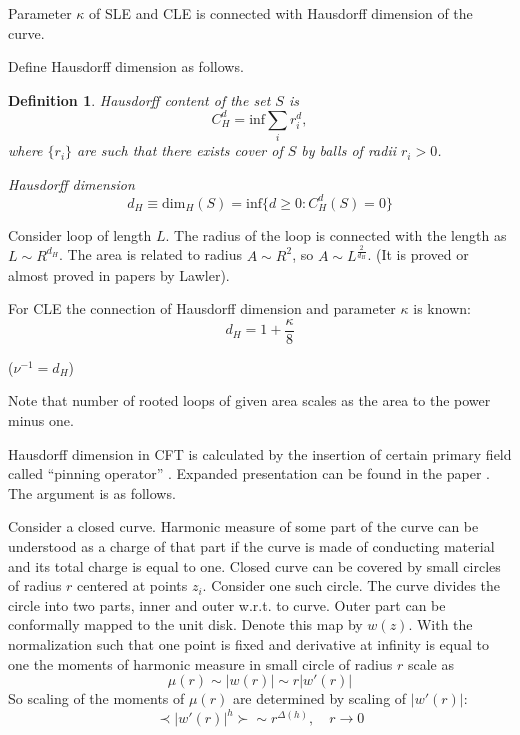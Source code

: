 \documentclass[12pt]{article}
\newtheorem{definition}{Definition}
\begin{document}
Parameter $\kappa$ of SLE and CLE is connected with Hausdorff dimension of the curve. 


Define Hausdorff dimension as follows.
\begin{definition}
  {\it Hausdorff content} of the set $S$ is
  \begin{equation}
    \label{eq:3}
    C^d_H = \mathrm{inf} \sum_i r_i^d,
  \end{equation}
  where $\{r_i\}$ are such that there exists cover of $S$ by balls of
  radii $r_i>0$. 

  {\it Hausdorff dimension}
  \begin{equation}
    \label{eq:4}
    d_H\equiv\mathrm{dim}_H(S) = \mathrm{inf}\{ d\geq 0: C^d_H(S)=0\}
  \end{equation}
\end{definition}


Consider loop of length $L$. The radius of the loop is connected with
the length as $L\sim R^{d_H}$. The area is related to radius $A\sim
R^2$, so $A\sim L^{\frac{2}{d_H}}$.
(It is proved or almost proved in papers by Lawler).

For CLE the connection of Hausdorff dimension and parameter $\kappa$
is known:
\begin{equation}
  \label{eq:5}
  d_H=1+\frac{\kappa}{8}
\end{equation}

($\nu^{-1}=d_H$)

Note that number of rooted loops of given area scales as the area to
the power minus one. 

Hausdorff dimension in CFT is calculated by the insertion of certain primary field called ``pinning
operator'' \cite{bettelheim2005harmonic}. Expanded presentation can be found in the paper
\cite{gruzberg2006stochastic}. The argument is as follows. 

Consider a closed curve. Harmonic measure of some part of the curve can be understood as a charge of
that part if the curve is made of conducting material and its total charge is equal to one. 
Closed curve can be covered by small circles of radius $r$ centered at points
$z_{i}$. Consider one such circle. The curve divides the circle into two parts, inner and outer
w.r.t. to curve. Outer part can be conformally mapped to the unit disk. Denote this map by $w(z)$.
With the normalization such that one point is fixed and derivative at infinity is equal to one the
moments of harmonic measure in small circle of radius $r$ scale as
\begin{equation}
  \label{eq:116}
  \mu(r)\sim |w(r)|\sim r |w'(r)|
\end{equation}
So scaling of the moments of $\mu(r)$ are determined by scaling of $|w'(r)|$:
\begin{equation}
  \label{eq:117}
  \prec |w'(r)|^{h}\succ \sim r^{\Delta(h)}, \quad r\to 0
\end{equation}
\end{document}
